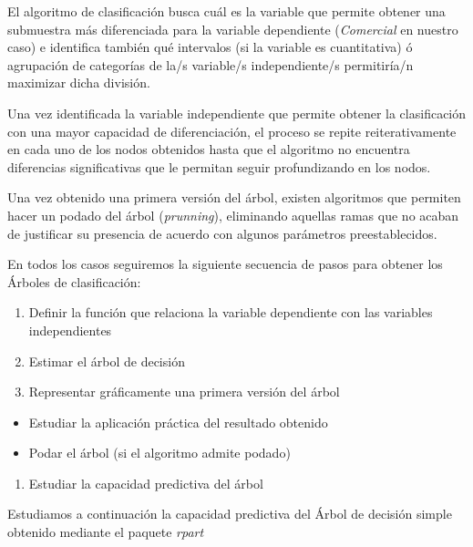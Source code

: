 \documentclass[]{article}
\providecommand{\tightlist}{%
  \setlength{\itemsep}{0pt}\setlength{\parskip}{0pt}}
\begin{document}
El algoritmo de clasificación busca cuál es la variable que permite
obtener una submuestra más diferenciada para la variable dependiente
(\emph{Comercial} en nuestro caso) e identifica también qué intervalos
(si la variable es cuantitativa) ó agrupación de categorías de la/s
variable/s independiente/s permitiría/n maximizar dicha división.

Una vez identificada la variable independiente que permite obtener la
clasificación con una mayor capacidad de diferenciación, el proceso se
repite reiterativamente en cada uno de los nodos obtenidos hasta que el
algoritmo no encuentra diferencias significativas que le permitan seguir
profundizando en los nodos.

Una vez obtenido una primera versión del árbol, existen algoritmos que
permiten hacer un podado del árbol (\emph{prunning}), eliminando
aquellas ramas que no acaban de justificar su presencia de acuerdo con
algunos parámetros preestablecidos.

En todos los casos seguiremos la siguiente secuencia de pasos para
obtener los Árboles de clasificación:

\begin{enumerate}
\def\labelenumi{\arabic{enumi}.}
\item
  Definir la función que relaciona la variable dependiente con las
  variables independientes
\item
  Estimar el árbol de decisión
\item
  Representar gráficamente una primera versión del árbol
\end{enumerate}

\begin{itemize}
\item
  Estudiar la aplicación práctica del resultado obtenido
\item
  Podar el árbol (si el algoritmo admite podado)
\end{itemize}

\begin{enumerate}
\def\labelenumi{\arabic{enumi}.}
\setcounter{enumi}{3}
\tightlist
\item
  Estudiar la capacidad predictiva del árbol
\end{enumerate}

Estudiamos a continuación la capacidad predictiva del Árbol de decisión
simple obtenido mediante el paquete \emph{rpart}
\end{document}
